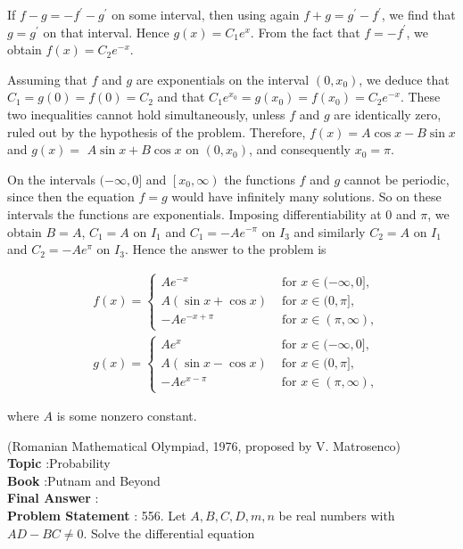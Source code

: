 \documentclass[10pt]{article}
\begin{document}
If $f-g=-f^{\prime}-g^{\prime}$ on some interval, then using again $f+g=g^{\prime}-f^{\prime}$, we find that $g=g^{\prime}$ on that interval. Hence $g(x)=C_{1} e^{x}$. From the fact that $f=-f^{\prime}$, we obtain $f(x)=C_{2} e^{-x}$.

Assuming that $f$ and $g$ are exponentials on the interval $\left(0, x_{0}\right)$, we deduce that $C_{1}=g(0)=f(0)=C_{2}$ and that $C_{1} e^{x_{0}}=g\left(x_{0}\right)=f\left(x_{0}\right)=C_{2} e^{-x}$. These two inequalities cannot hold simultaneously, unless $f$ and $g$ are identically zero, ruled out by the hypothesis of the problem. Therefore, $f(x)=A \cos x-B \sin x$ and $g(x)=$ $A \sin x+B \cos x$ on $\left(0, x_{0}\right)$, and consequently $x_{0}=\pi$.

On the intervals $(-\infty, 0]$ and $\left[x_{0}, \infty\right)$ the functions $f$ and $g$ cannot be periodic, since then the equation $f=g$ would have infinitely many solutions. So on these intervals the functions are exponentials. Imposing differentiability at 0 and $\pi$, we obtain $B=A$, $C_{1}=A$ on $I_{1}$ and $C_{1}=-A e^{-\pi}$ on $I_{3}$ and similarly $C_{2}=A$ on $I_{1}$ and $C_{2}=-A e^{\pi}$ on $I_{3}$. Hence the answer to the problem is

$$
\begin{aligned}
&f(x)= \begin{cases}A e^{-x} & \text { for } x \in(-\infty, 0], \\
A(\sin x+\cos x) & \text { for } x \in(0, \pi], \\
-A e^{-x+\pi} & \text { for } x \in(\pi, \infty),\end{cases} \\
&g(x)= \begin{cases}A e^{x} & \text { for } x \in(-\infty, 0], \\
A(\sin x-\cos x) & \text { for } x \in(0, \pi], \\
-A e^{x-\pi} & \text { for } x \in(\pi, \infty),\end{cases}
\end{aligned}
$$

where $A$ is some nonzero constant.

(Romanian Mathematical Olympiad, 1976, proposed by V. Matrosenco)
\\
\textbf{Topic} :Probability\\
\textbf{Book} :Putnam and Beyond\\
\textbf{Final Answer} :\\


\textbf{Problem Statement} :
556. Let $A, B, C, D, m, n$ be real numbers with $A D-B C \neq 0$. Solve the differential equation
\end{document}
